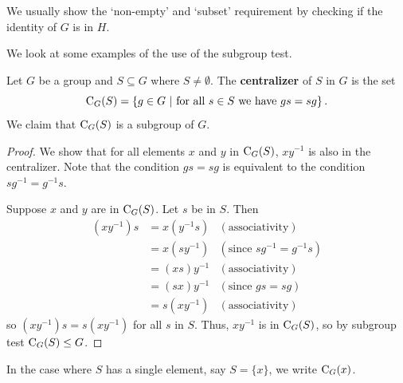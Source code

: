 \begin{remark}
We usually show the `non-empty' and `subset' requirement by checking if the identity of $G$ is in $H$.
\end{remark}

We look at some examples of the use of the subgroup test.
\begin{example}\label{example-centralizer-of-a-subset}
    Let $G$ be a group and $S \subseteq G$ where $S \neq \emptyset$. The \textbf{centralizer} of $S$ in $G$ is the set
    \[
        \C{G}{S} = \left\{g \in G \ | \ \text{for all } s \in S \text{ we have } gs = sg\right\}.
    \]
    We claim that $\mathrm{C}_{G}(S)$ is a subgroup of $G$.
    \begin{proof}
        We show that for all elements $x$ and $y$ in $\mathrm{C}_{G}(S)$, $xy^{-1}$ is also in the centralizer. Note that the condition $gs = sg$ is equivalent to the condition $sg^{-1} = g^{-1}s$.

        Suppose $x$ and $y$ are in $\mathrm{C}_{G}(S)$. Let $s$ be in $S$. Then
        \begin{align*}
            (xy^{-1})s &= x(y^{-1}s) & (\text{associativity})\\
            &= x(sy^{-1}) & (\text{since } sg^{-1} = g^{-1}s)\\
            &= (xs)y^{-1} & (\text{associativity})\\
            &= (sx)y^{-1} & (\text{since } gs = sg)\\
            &= s(xy^{-1}) & (\text{associativity})
        \end{align*}
        so $(xy^{-1})s = s(xy^{-1})$ for all $s$ in $S$. Thus, $xy^{-1}$ is in $\mathrm{C}_{G}(S)$, so by subgroup test $\mathrm{C}_{G}(S) \leq G$.
    \end{proof}
\end{example}
\begin{remark}
    In the case where $S$ has a single element, say $S = \{x\}$, we write $\mathrm{C}_{G}(x)$.
\end{remark}

